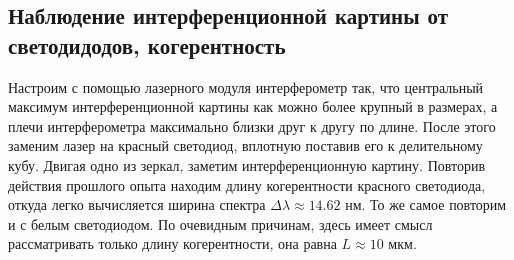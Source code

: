 \documentclass[a4paper, 12pt]{article}
\begin{document}
	\subsection*{Наблюдение интерференционной картины от светодидодов, когерентность}
	Настроим с помощью лазерного модуля интерферометр так, что центральный максимум интерференционной картины как можно более крупный в размерах, а плечи интерферометра максимально близки друг к другу по длине. После этого заменим лазер на красный светодиод, вплотную поставив его к делительному кубу. Двигая одно из зеркал, заметим интерференционную картину. Повторив действия прошлого опыта находим длину когерентности красного светодиода, откуда легко вычисляется ширина спектра $\Delta \lambda \approx 14.62$ нм. То же самое повторим и с белым светодиодом. По очевидным причинам, здесь имеет смысл рассматривать только длину когерентности, она равна $L \approx 10$ мкм.
\end{document}
